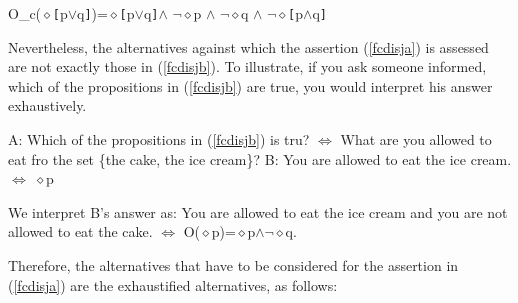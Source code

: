 \documentclass[a4paper,11pt]{article}
\begin{document}
\begin{exe}
\ex\label{fccontr} O_c($\diamond$\verb![!p$\vee$q\verb!]!)=$\diamond$\verb![!p$\vee$q\verb!]!$\wedge$ $\neg\diamond$p $\wedge$ $\neg\diamond$q $\wedge$ $\neg\diamond$\verb![!p$\wedge$q\verb!]!
\end{exe}
Nevertheless, the alternatives against which the assertion (\ref{fcdisja}) is assessed are not exactly those in (\ref{fcdisjb}).
To illustrate, if you ask someone informed, which of the propositions in (\ref{fcdisjb}) are true, you would interpret his answer exhaustively.
\begin{exe}
\ex\label{questalt} \begin{xlist}
\ex\label{questalta} A: Which of the propositions in (\ref{fcdisjb}) is tru? $\Leftrightarrow$ What are you allowed to eat fro the set \{the cake, the ice cream\}?
\ex\label{questaltb} B: You are allowed to eat the ice cream. $\Leftrightarrow$ $\diamond$p
\end{xlist}
\end{exe}
We interpret B's answer as: You are allowed to eat the ice cream and you are not allowed to eat the cake. $\Leftrightarrow$ O($\diamond$p)=$\diamond$p$\wedge$$\neg\diamond$q.

Therefore, the alternatives that have to be considered for the assertion in (\ref{fcdisja}) are the exhaustified alternatives, as follows:
\end{document}
